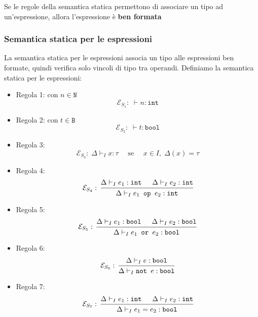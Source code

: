 \documentclass[a4paper]{article}
\begin{document}
Se le regole della semantica statica permettono di associare un tipo ad un'espressione,
allora l'espressione è \textbf{ben formata}

\subsubsection{Semantica statica per le espressioni}
La semantica statica per le espressioni associa un tipo alle espressioni ben formate,
quindi verifica solo vincoli di tipo tra operandi.
Definiamo la semantica statica per le espressioni:
\begin{itemize}
  \item Regola 1: con \( n \in \texttt{N} \)
    \[
      \mathcal{E}_{S_1}: \; \vdash n : \texttt{int}
    \] 

  \item Regola 2: con \( t \in \texttt{B} \)
    \[
      \mathcal{E}_{S_2}: \; \vdash t : \texttt{bool}
    \] 

  \item Regola 3:
    \[
      \mathcal{E}_{S_3}: \;
      \Delta \vdash_I x : \tau \quad\text{ se }\quad x \in I,\; \Delta(x) = \tau
    \] 

  \item Regola 4:
    \[
      \mathcal{E}_{S_4}: \;
      \begin{prooftree}
        \hypo{\Delta \vdash_I e_1 : \texttt{int}}
        \hypo{\Delta \vdash_I e_2 : \texttt{int}}
        \infer2{\Delta \vdash_I e_1 \texttt{ op } e_2 : \texttt{int}}
      \end{prooftree}
    \] 

  \item Regola 5:
    \[
      \mathcal{E}_{S_5}: \;
      \begin{prooftree}
        \hypo{\Delta \vdash_I e_1 : \texttt{bool}}
        \hypo{\Delta \vdash_I e_2 : \texttt{bool}}
        \infer2{\Delta \vdash_I e_1 \texttt{ or } e_2 : \texttt{bool}}
      \end{prooftree}
    \]

  \item Regola 6:
    \[
      \mathcal{E}_{S_6}: \;
      \begin{prooftree}
        \hypo{\Delta \vdash_I e : \texttt{bool}}
        \infer1{\Delta \vdash_I \texttt{not } e : \texttt{bool}}
      \end{prooftree}
    \]

  \item Regola 7:
    \[
      \mathcal{E}_{S_7}: \;
      \begin{prooftree}
        \hypo{\Delta \vdash_I e_1 : \texttt{int}}
        \hypo{\Delta \vdash_I e_2 : \texttt{int}}
        \infer2{\Delta \vdash_I e_1 = e_2 : \texttt{bool}}
      \end{prooftree}
    \]
\end{itemize}
\end{document}
